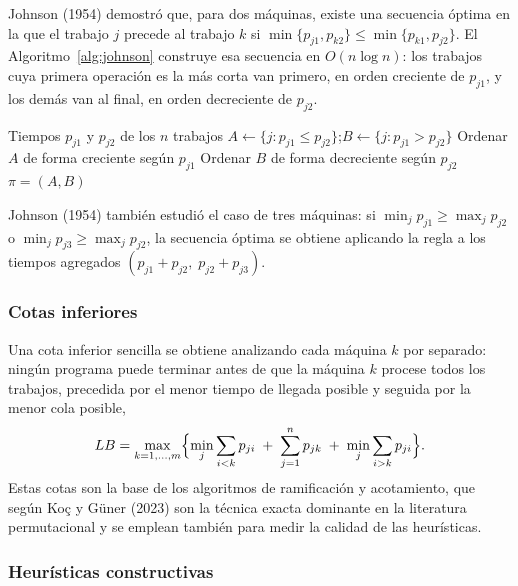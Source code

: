 Johnson (1954) demostró que, para dos máquinas, existe una secuencia óptima en la que el
trabajo $j$ precede al trabajo $k$ si $\min\{p_{j1},p_{k2}\} \le \min\{p_{k1},p_{j2}\}$.
El Algoritmo~\ref{alg:johnson} construye esa secuencia en $O(n\log n)$: los trabajos
cuya primera operación es la más corta van primero, en orden creciente de $p_{j1}$, y los
demás van al final, en orden decreciente de $p_{j2}$.

\begin{algorithm}[htbp]
\caption{Regla de Johnson para $F2\,|\,prmu\,|\,\Cmax$}\label{alg:johnson}
\begin{algorithmic}[1]
\Require Tiempos $p_{j1}$ y $p_{j2}$ de los $n$ trabajos
\State $A \gets \{j : p_{j1} \le p_{j2}\}$;\quad $B \gets \{j : p_{j1} > p_{j2}\}$
\State Ordenar $A$ de forma creciente según $p_{j1}$
\State Ordenar $B$ de forma decreciente según $p_{j2}$
\State \Return $\pi = (A, B)$
\end{algorithmic}
\end{algorithm}

Johnson (1954) también estudió el caso de tres máquinas: si $\min_j p_{j1}\ge\max_j p_{j2}$
o $\min_j p_{j3}\ge\max_j p_{j2}$, la secuencia óptima se obtiene aplicando la regla a los
tiempos agregados $(p_{j1}+p_{j2},\;p_{j2}+p_{j3})$.

\subsubsection{Cotas inferiores}

Una cota inferior sencilla se obtiene analizando cada máquina $k$ por separado: ningún
programa puede terminar antes de que la máquina $k$ procese todos los trabajos, precedida
por el menor tiempo de llegada posible y seguida por la menor cola posible,
\begin{equation}\label{eq:lb}
LB = \max_{k=1,\ldots,m}\Bigl\{\min_j \sum_{i<k} p_{ji} \;+\; \sum_{j=1}^{n} p_{jk} \;+\; \min_j \sum_{i>k} p_{ji}\Bigr\}.
\end{equation}
Estas cotas son la base de los algoritmos de ramificación y acotamiento, que según Koç y
Güner (2023) son la técnica exacta dominante en la literatura permutacional y se emplean
también para medir la calidad de las heurísticas.

\subsubsection{Heurísticas constructivas}

